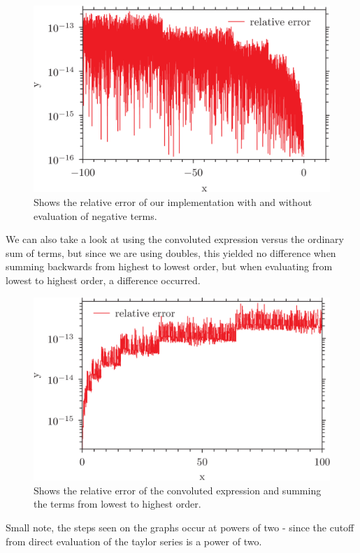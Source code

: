 \documentclass{article}
\begin{document}
\begin{figure}[h]
	\includegraphics{plot3.png}
	\caption{Shows the relative error of our implementation with and without evaluation of negative terms.}
	\label{fig:negative}
\end{figure}
We can also take a look at using the convoluted expression versus the ordinary sum of terms, but since we are using doubles, this yielded no difference when summing backwards from highest to lowest order, but when evaluating from lowest to highest order, a difference occurred.
\begin{figure}[h]
	\includegraphics{plot4.png}
	\caption{Shows the relative error of the convoluted expression and summing the terms from lowest to highest order.}
	\label{fig:summation}
\end{figure}

Small note, the steps seen on the graphs occur at powers of two - since the cutoff from direct evaluation of the taylor series is a power of two.
\end{document}
